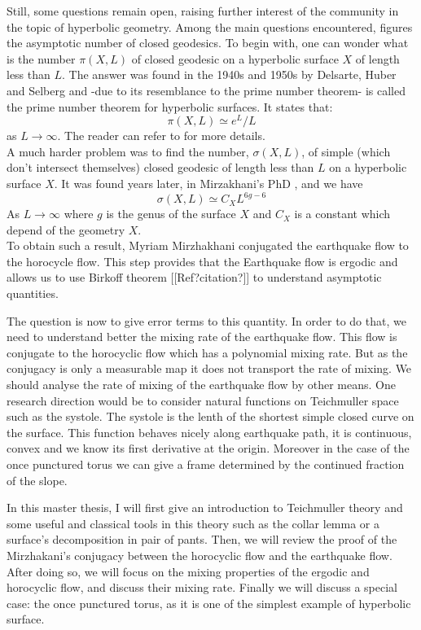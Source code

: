 \vspace{10 px}

Still, some questions remain open, raising further interest of the community in the topic of hyperbolic geometry.
Among the main questions encountered, figures the asymptotic number of closed geodesics. To begin with, one can wonder what is the number $\pi(X,L)$ of closed geodesic on a hyperbolic surface $X$ of length less than $L$. The answer was found in the 1940s and 1950s by Delsarte, Huber and Selberg and -due to its resemblance to the prime number theorem- is called the prime number theorem for hyperbolic surfaces. It states that:\[
\pi(X,L) \simeq e^{L} / L
\]
as $L \to \infty$. The reader can refer to \cite{buser2010geometry} for more details.\\

A much harder problem was to find the number, $\sigma(X,L)$, of simple (which don't intersect themselves) closed geodesic of length less than $L$ on a hyperbolic surface $X$. It was found years later, in Mirzakhani's PhD \cite{mirzakhani2004simple}, and we have \[
\sigma(X,L) \simeq C_{X}L^{6g-6}
\]
As $L \to \infty$ where $g$ is the genus of the surface $X$ and $C_{X}$ is a constant which depend of the geometry $X$.\\
To obtain such a result, Myriam Mirzhakhani conjugated the earthquake flow to the horocycle flow. This step provides that the Earthquake flow is ergodic and allows us to use Birkoff theorem [[Ref?citation?]] to understand asymptotic quantities.

\vspace{10 px}

The question is now to give error terms to this quantity. In order to do that, we need to understand better the mixing rate of the earthquake flow. This flow is conjugate to the horocyclic flow which has a polynomial mixing rate. But as the conjugacy is only a measurable map it does not transport the rate of mixing. We should analyse the rate of mixing of the earthquake flow by other means. One research direction would be to consider natural functions on Teichmuller space such as the systole. The systole is the lenth of the shortest simple closed curve on the surface. This function behaves nicely along earthquake path, it is continuous, convex and we know its first derivative at the origin. Moreover in the case of the once punctured torus we can give a frame determined by the continued fraction of the slope.

\vspace{10 px}

In this master thesis, I will first give an introduction to Teichmuller theory and some useful and classical tools in this theory such as the collar lemma or a surface's decomposition in pair of pants. Then, we will review the proof of the Mirzhakani's conjugacy between the horocyclic flow and the earthquake flow. After doing so, we will focus on the mixing properties of the ergodic and horocyclic flow, and discuss their mixing rate. Finally we will discuss a special case: the once punctured torus, as it is one of the simplest example of hyperbolic surface.
